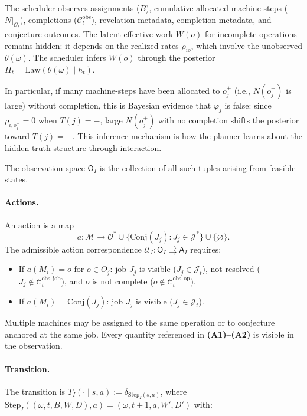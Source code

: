 \begin{remark}
The scheduler observes assignments ($B$), cumulative allocated machine-steps
($N|_{\mathcal{O}_t}$), completions ($\mathcal{C}_t^{\mathrm{obs}}$), revelation
metadata, completion metadata, and conjecture outcomes. The latent effective work
$W(o)$ for incomplete operations remains hidden: it depends on the realized rates
$\rho_{io}$, which involve the unobserved $\theta(\omega)$. The scheduler infers
$W(o)$ through the posterior $\Pi_t = \mathrm{Law}(\theta(\omega) \mid h_t)$.

In particular, if many machine-steps have been allocated to $o_j^+$ (i.e., $N(o_j^+)$
is large) without completion, this is Bayesian evidence that $\varphi_j$ is false:
since $\rho_{i,o_j^+} = 0$ when $T(j) = -$, large $N(o_j^+)$ with no completion
shifts the posterior toward $T(j) = -$. This inference mechanism is how the planner
learns about the hidden truth structure through interaction.
\end{remark}

The observation space $\mathsf{O}_I$ is the collection of all such tuples arising
from feasible states.

\paragraph{Actions.} An action is a map
\[
a : \mathcal{M} \to \mathcal{O}^* \cup
\{\mathrm{Conj}(J_j) : J_j \in \mathcal{J}^*\} \cup \{\varnothing\}.
\]
The admissible action correspondence
$\mathcal{U}_I : \mathsf{O}_I \rightrightarrows \mathsf{A}_I$ requires:
\begin{itemize}
    \item[\textbf{(A1)}] If $a(M_i) = o$ for $o \in O_j$: job $J_j$ is visible
    ($J_j \in \mathcal{J}_t$), not resolved
    ($J_j \notin \mathcal{C}_t^{\mathrm{obs,job}}$), and $o$ is not complete
    ($o \notin \mathcal{C}_t^{\mathrm{obs,op}}$).

    \item[\textbf{(A2)}] If $a(M_i) = \mathrm{Conj}(J_j)$: job $J_j$ is visible
    ($J_j \in \mathcal{J}_t$).
\end{itemize}
Multiple machines may be assigned to the same operation or to conjecture anchored at
the same job. Every quantity referenced in \textbf{(A1)--(A2)} is visible in the
observation.

\paragraph{Transition.} The transition is $T_I(\cdot \mid s, a) :=
\delta_{\mathrm{Step}_I(s, a)}$, where
$\mathrm{Step}_I((\omega, t, B, W, D), a) = (\omega, t+1, a, W', D')$ with:

